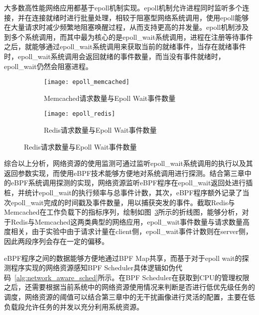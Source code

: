 大多数高性能网络应用都基于epoll机制实现。epoll机制允许进程同时监听多个连接，并在连接就绪时进行批量处理，相较于阻塞型网络系统调用，使用epoll能够在大量请求时减少频繁地阻塞唤醒过程，从而支持更高的并发量。epoll机制涉及到多个系统调用，而其中最为核心的是epoll\_wait系统调用，进程在注册等待事件之后，就能够通过epoll\_wait系统调用来获取当前的就绪事件，当存在就绪事件时，epoll\_wait系统调用会返回就绪的事件数量，而当没有事件就绪时，epoll\_wait仍然会阻塞进程。

\begin{figure}[H]
    \centering
    \begin{subfigure}[b]{0.49\textwidth}
        \texttt{[image: epoll\_memcached]}
        \caption{Memcached请求数量与Epoll Wait事件数量}
        \label{fig:epoll_memcached}
    \end{subfigure}
    \begin{subfigure}[b]{0.49\textwidth}
        \texttt{[image: epoll\_redis]}
        \caption{Redis请求数量与Epoll Wait事件数量}
        \label{fig:epoll_redis}
    \end{subfigure}
\label{fig:epoll_request}
\end{figure}

综合以上分析，网络资源的使用监测可通过监听epoll\_wait系统调用的执行以及其返回参数实现，而使用eBPF技术能够方便地对系统调用进行探测。结合第三章中的eBPF系统调用探测的实现，网络资源监听eBPF程序在epoll\_wait返回处进行插桩，并统计epoll\_wait的执行频率与总事件计数，其次，eBPF程序额外记录了当次epoll\_wait完成的时间戳及事件数量，用以捕获突发的事件。截取Redis与Memcached在工作负载下的指标序列，绘制如图~\ref{fig:epoll_request}所示的折线图，能够分析，对于Redis与Memcached这两类典型的网络应用，epoll\_wait事件数量与请求数量高度相关，由于实验中由于请求计量在client侧，epoll\_wait事件计数则在server侧，因此两段序列会存在一定的偏移。

eBPF程序之间的数据能够方便地通过BPF Map共享，而基于对于epoll wait的探测程序实现的网络资源感知BPF Scheduler具体逻辑如伪代码~\ref{alg:network_aware_sched}所示。在BPF Scheduler在获取到CPU的管理权限之后，还需要根据当前系统中的网络资源使用情况来判断是否进行低优先级任务的调度，网络资源的阈值可以结合第三章中的无干扰画像进行灵活的配置，主要在低负载段允许任务的并发以充分利用系统资源。

